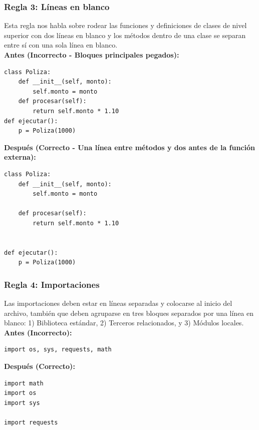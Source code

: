 \documentclass{article}
\begin{document}
		\subsubsection*{Regla 3: Líneas en blanco}
   		Esta regla nos habla sobre rodear las funciones y definiciones de clases de nivel superior con dos líneas en blanco y 
		los métodos dentro de una clase se separan entre sí con una sola línea en blanco.\\
    
    	\textbf{Antes (Incorrecto - Bloques principales pegados):}
    	\begin{verbatim}
class Poliza:
    def __init__(self, monto):
        self.monto = monto
    def procesar(self):
        return self.monto * 1.10
def ejecutar():
    p = Poliza(1000)
	    \end{verbatim}
    
    	\textbf{Después (Correcto - Una línea entre métodos y dos antes de la función externa):}
    	\begin{verbatim}
class Poliza:
    def __init__(self, monto):
        self.monto = monto

    def procesar(self):
        return self.monto * 1.10


def ejecutar():
    p = Poliza(1000)
    	\end{verbatim}
    	\subsubsection*{Regla 4: Importaciones}
    	Las importaciones deben estar en líneas separadas y colocarse al inicio del archivo, también que deben agruparse en tres
		 bloques separados por una línea en blanco: 1) Biblioteca estándar, 2) Terceros relacionados, y 3) Módulos locales.\\
    
    	\textbf{Antes (Incorrecto):}
    	\begin{verbatim}
import os, sys, requests, math
    	\end{verbatim}
    
    	\textbf{Después (Correcto):}
    	\begin{verbatim}
import math
import os
import sys

import requests
    	\end{verbatim}
	\newpage
\end{document}
